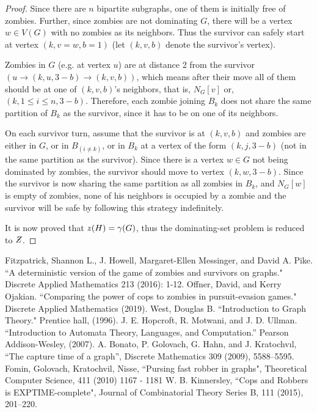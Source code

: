 \documentclass[1p]{elsarticle}
\newcommand{\NPZ}{\ooalign{$Z$\cr\hfil\rule[.8ex]{.3em}{.09ex}\hfil\cr}}
\newcommand{\zn}{\ooalign{$z$\cr\hfil\rule[.5ex]{.2em}{.08ex}\hfil\cr}}
\begin{document}
\begin{proof}
		Since there are $n$ bipartite subgraphs, one of them is initially free of zombies. Further, since zombies are
		not dominating $G$, there will be a vertex $w \in V(G)$ with no zombies as its neighbors. Thus the survivor can
		safely start at vertex $(k,v = w,b = 1)$ (let $(k,v,b)$ denote the survivor's vertex).

		Zombies in $G$ (e.g. at vertex $u$) are at distance 2 from the survivor $(u \rightarrow (k,u,3 - b) \rightarrow
		(k,v,b))$, which means after their move all of them should be at one of $(k,v,b)$'s neighbors, that is, $N_G[v]
		$ or, $ (k,1 \leq i \leq n,3 - b)$. Therefore, each zombie joining $B_k$ does not share the same partition of
		$B_k$ as the survivor, since it has to be on one of its neighbors.
		
		On each survivor turn, assume that the survivor is at $(k,v,b)$ and zombies are either in $G$, or in $B_{(i \neq
		k)}$, or in $B_k$ at a vertex of the form $(k,j,3-b)$ (not in the same partition as the survivor). Since there
		is a vertex $w \in G$ not being dominated by zombies, the survivor should move to vertex $(k,w,3-b)$. Since the
		survivor is now sharing the same partition as all zombies in $B_k$, and $N_G[w]$ is empty of zombies, none of
		his neighbors is occupied by a zombie and the survivor will be safe by following this strategy indefinitely.

		It is now proved that $\zn(H) = \gamma(G)$, thus the dominating-set problem is reduced to $\NPZ$.

	\end{proof}
\begin{thebibliography}{999}
	
	Fitzpatrick, Shannon L., J. Howell, Margaret-Ellen Messinger, and David A. Pike. ``A deterministic version of the
	game of zombies and survivors on graphs." Discrete Applied Mathematics 213 (2016): 1-12.
	Offner, David, and Kerry Ojakian. ``Comparing the power of cops to zombies in pursuit-evasion games." Discrete
	Applied Mathematics (2019).
	West, Douglas B. ``Introduction to Graph Theory." Prentice hall, (1996).
	J. E. Hopcroft, R. Motwani, and J. D. Ullman. ``Introduction to Automata Theory, Languages, and Computation.''
	Pearson Addison-Wesley, (2007).
	A. Bonato, P. Golovach, G. Hahn, and J. Kratochvıl, ``The capture time of a graph'', Discrete Mathematics 309 (2009), 5588–5595.
	Fomin, Golovach, Kratochvil, Nisse, ``Pursing fast robber in graphs", Theoretical Computer Science, 411 (2010) 1167 - 1181
	W. B. Kinnersley, ``Cops and Robbers is EXPTIME-complete", Journal of Combinatorial Theory Series B, 111 (2015), 201–220.
\end{thebibliography}
	
\end{document}

